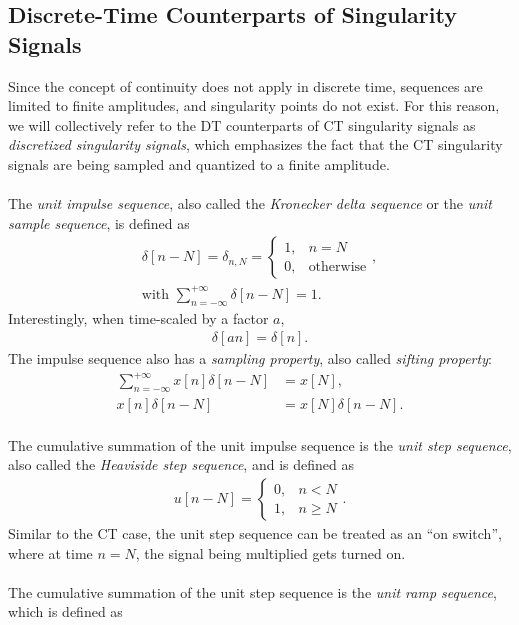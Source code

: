 \documentclass{report}
\begin{document}
\subsection{Discrete-Time Counterparts of Singularity Signals}
Since the concept of continuity does not apply in discrete time, sequences are limited to finite amplitudes, and singularity points do not exist. 
For this reason, we will collectively refer to the DT counterparts of CT singularity signals as \emph{discretized singularity signals}, which 
emphasizes the fact that the CT singularity signals are being sampled and quantized to a finite amplitude.
\\ \\
The \emph{unit impulse sequence}, also called the \emph{Kronecker delta sequence} or the \emph{unit sample sequence}, is defined as 
\begin{align}
    \delta[n-N] = \delta_{n,N} =
    \begin{cases} 
        1, & n=N \\
        0, & \text{otherwise}
    \end{cases}, \\
    \text{with } \sum_{n=-\infty}^{+\infty} \delta[n-N] = 1.
\end{align}
Interestingly, when time-scaled by a factor $a$,
\begin{align}
    \delta[an] = \delta[n].
\end{align}
The impulse sequence also has a \emph{sampling property}, also called \emph{sifting property}:
\begin{align}
    \sum_{n=-\infty}^{+\infty} x[n]\delta[n-N]&= x[N], \\
    x[n]\delta[n-N] &= x[N]\delta[n-N].
\end{align} \\
The cumulative summation of the unit impulse sequence is the \emph{unit step sequence}, also called the \emph{Heaviside step sequence}, and is defined as 
\begin{align}
    u[n-N] = 
    \begin{cases} 
        0, & n<N \\
        1, & n\geq N
    \end{cases}.
\end{align}
Similar to the CT case, the unit step sequence can be treated as an ``on switch'', where at time $n=N$, the signal being multiplied gets turned on. 
\\ \\
The cumulative summation of the unit step sequence is the \emph{unit ramp sequence}, which is defined as
\end{document}
